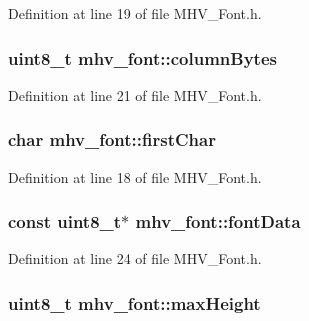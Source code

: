 Definition at line 19 of file M\-H\-V\-\_\-\-Font.\-h.

\hypertarget{structmhv__font_aee0716d7afae1a161ddab7859aebeb6b}{
\subsubsection[{column\-Bytes}]{\setlength{\rightskip}{0pt plus 5cm}uint8\-\_\-t mhv\-\_\-font\-::column\-Bytes}}\label{structmhv__font_aee0716d7afae1a161ddab7859aebeb6b}


Definition at line 21 of file M\-H\-V\-\_\-\-Font.\-h.

\hypertarget{structmhv__font_a675ce1bde33e6b62a4aff2ba955e61c7}{
\subsubsection[{first\-Char}]{\setlength{\rightskip}{0pt plus 5cm}char mhv\-\_\-font\-::first\-Char}}\label{structmhv__font_a675ce1bde33e6b62a4aff2ba955e61c7}


Definition at line 18 of file M\-H\-V\-\_\-\-Font.\-h.

\hypertarget{structmhv__font_a2143c1f24a538699b21c26a0e848061e}{
\subsubsection[{font\-Data}]{\setlength{\rightskip}{0pt plus 5cm}const uint8\-\_\-t$\ast$ mhv\-\_\-font\-::font\-Data}}\label{structmhv__font_a2143c1f24a538699b21c26a0e848061e}


Definition at line 24 of file M\-H\-V\-\_\-\-Font.\-h.

\hypertarget{structmhv__font_aa15b52666692c10a27f9b5fcbed78780}{
\subsubsection[{max\-Height}]{\setlength{\rightskip}{0pt plus 5cm}uint8\-\_\-t mhv\-\_\-font\-::max\-Height}}\label{structmhv__font_aa15b52666692c10a27f9b5fcbed78780}


